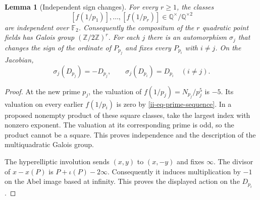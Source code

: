 \documentclass[11pt,a4paper]{article}
\newtheorem{lemma}[theorem]{Lemma}
\theoremstyle{definition}
\theoremstyle{remark}
\numberwithin{equation}{section}
\begin{document}
\begin{lemma}[Independent sign changes]
\label{ii-lem-signs}
For every $r\ge1$, the classes
\[
 [f(1/p_1)],\ldots,[f(1/p_r)]
       \in\mathbb Q^{\times}/\mathbb Q^{\times2}
\]
are independent over $\mathbb F_2$.  Consequently the compositum of the
$r$ quadratic point fields has Galois group $(\mathbb Z/2\mathbb Z)^r$.
For each $j$ there is an automorphism $\sigma_j$ that changes the sign of
the ordinate of $P_{p_j}$ and fixes every $P_{p_i}$ with $i\ne j$.
On the Jacobian,
\[
 \sigma_j(D_{p_j})=-D_{p_j},\qquad
 \sigma_j(D_{p_i})=D_{p_i}\quad(i\ne j).
\]
\end{lemma}
\begin{proof}
At the new prime $p_j$, the valuation of
$f(1/p_j)=N_{p_j}/p_j^5$ is $-5$.  Its valuation on every earlier
$f(1/p_i)$ is zero by \eqref{ii-eq-prime-sequence}.  In a proposed
nonempty product of these square classes, take the largest index with
nonzero exponent.  The valuation at its corresponding prime is odd,
so the product cannot be a square.  This proves independence and the
description of the multiquadratic Galois group.

The hyperelliptic involution sends $(x,y)$ to $(x,-y)$ and fixes
$\infty$.  The divisor of $x-x(P)$ is
$P+\iota(P)-2\infty$.  Consequently it induces multiplication by
$-1$ on the Abel image based at infinity.  This proves the displayed
action on the $D_{p_i}$.
\end{proof}
\end{document}
